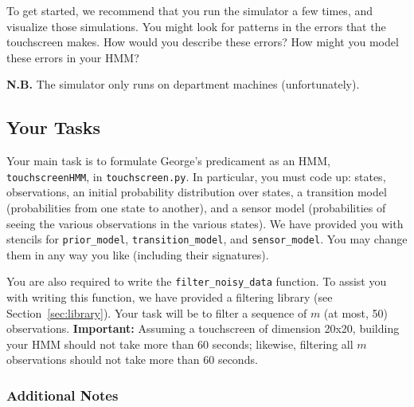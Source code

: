 \documentclass{article}
\begin{document}
To get started, we recommend that you run the simulator a few times,
and visualize those simulations.  You might look for patterns in the
errors that the touchscreen makes.  How would you describe these
errors?  How might you model these errors in your HMM?

\textbf{N.B.} The simulator only runs on department machines (unfortunately).


\subsection{Your Tasks}
Your main task is to formulate George's predicament as an HMM,
\texttt{touchscreenHMM}, in \texttt{touchscreen.py}.  In particular,
you must code up: states, observations, an initial probability
distribution over states, a transition model (probabilities from one
state to another), and a sensor model (probabilities of seeing the
various observations in the various states).
%
We have provided you with stencils for \texttt{prior\_model},
\texttt{transition\_model}, and \texttt{sensor\_model}.  You may
change them in any way you like (including their signatures).

You are also required to write the \texttt{filter\_noisy\_data}
function.  To assist you with writing this function, we have provided
a filtering library (see Section~\ref{sec:library}).
%
Your task will be to filter a sequence of $m$ (at most, 50) observations.
\textbf{Important:} Assuming a touchscreen of dimension 20x20,
building your HMM should not take more than 60 seconds; likewise,
filtering all $m$ observations should not take more than 60 seconds.


\subsubsection*{Additional Notes}
\end{document}
